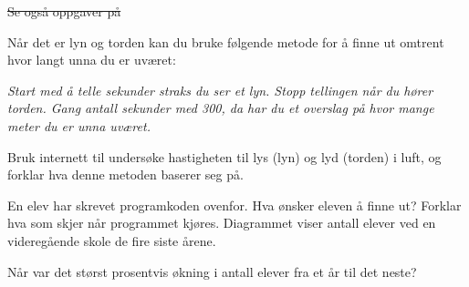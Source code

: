 





\st{Se også oppgaver på }	\newpage	

Når det er lyn og torden kan du bruke følgende metode for å finne ut omtrent hvor langt unna du er uværet:\os

\textsl{Start med å telle sekunder straks du ser et lyn. Stopp tellingen når du hører torden. Gang antall sekunder med 300, da har du et overslag på hvor mange meter du er unna uværet.}\os

Bruk internett til undersøke hastigheten til lys (lyn) og lyd (torden) i luft, og forklar hva denne metoden baserer seg på.

En elev har skrevet programkoden ovenfor.
Hva ønsker eleven å finne ut?
Forklar hva som skjer når programmet kjøres.
\newpage
{}
Diagrammet viser antall elever ved en videregående skole de fire siste årene.\os

Når var det størst prosentvis økning i antall elever fra et år til det neste?

